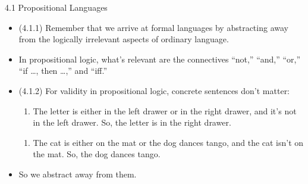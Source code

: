 \documentclass[../slides.tex]{subfiles}
\begin{document}
\begin{frame}{4.1 Propositional Languages}


	\begin{itemize}
	
		\item (4.1.1) Remember that we arrive at formal languages by abstracting away from the logically irrelevant aspects of ordinary language.
		
		\item In propositional logic, what's relevant are the connectives ``not,'' ``and,'' ``or,'' ``if \dots, then \dots,'' and ``iff.''
	
		\item (4.1.2) For validity in propositional logic, concrete sentences don't matter:
	\begin{enumerate}[(1)]
		
			\item The letter is either in the left drawer or in the right drawer, and it's not in the left drawer. So, the letter is in the right drawer.
		
		\end{enumerate}
	\begin{enumerate}[(1')]
		
			\item The cat is either on the mat or the dog dances tango, and the cat isn't on the mat. So, the dog dances tango.
		
		\end{enumerate}
		
		\item So we abstract away from them.
	
	
	\end{itemize}
		
\end{frame}
\end{document}
